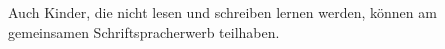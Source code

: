 Auch Kinder, die nicht lesen und schreiben lernen werden, können am gemeinsamen Schriftspracherwerb teilhaben.